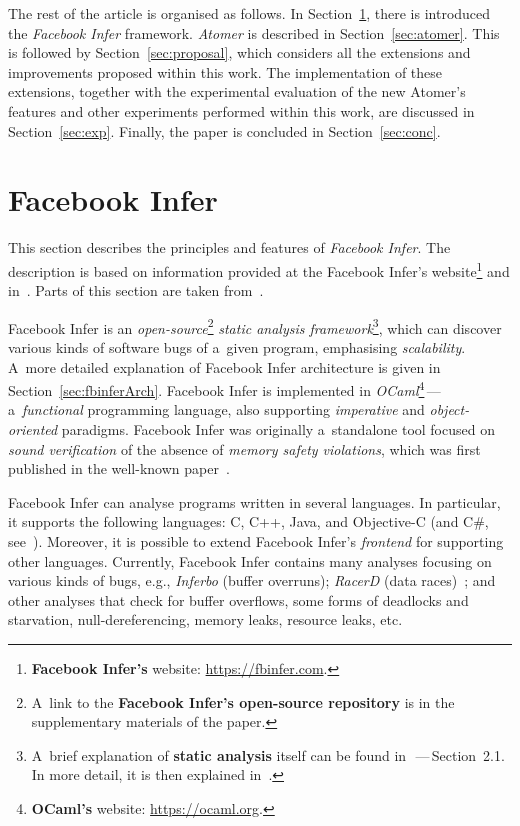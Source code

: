 \documentclass{ExcelAtFIT}
\theoremstyle{definition}
\begin{document}
The rest of the article is organised as follows. In Section~\ref{sec:infer}, there is introduced the \emph{Facebook Infer} framework. \emph{Atomer} is described in Section~\ref{sec:atomer}. This is followed by Section~\ref{sec:proposal}, which considers all the extensions and improvements proposed within this work. The implementation of these extensions, together with the experimental evaluation of the new Atomer's features and other experiments performed within this work, are discussed in Section~\ref{sec:exp}. Finally, the paper is concluded in Section~\ref{sec:conc}.


\section{Facebook Infer}
\label{sec:infer}

This section describes the principles and features of \emph{Facebook Infer}. The description is based on information provided at the Facebook Infer's website\footnote{\textbf{Facebook Infer's} website: \url{https://fbinfer.com}.} and in~\cite{inferAISpeech}. Parts of this section are taken from~\cite{harmimBP}.

Facebook Infer is an \emph{open-source}\footnote{A~link to the \textbf{Facebook Infer's open-source repository} is in the supplementary materials of the paper.} \emph{static analysis framework}\footnote{A~brief explanation of \textbf{static analysis} itself can be found in~\cite{harmimBP}\,---\,Section~2.1. In more detail, it is then explained in~\cite{staticAnalysisMoller, programAnalysisNielson, staticAnalysisRival}.}, which can discover various kinds of software bugs of a~given program, emphasising \emph{scalability}. A~more detailed explanation of Facebook Infer architecture is given in Section~\ref{sec:fbinferArch}. Facebook Infer is implemented in \emph{OCaml}\footnote{\textbf{OCaml's} website: \url{https://ocaml.org}.}\,---\,a~\emph{functional} programming language, also supporting \emph{imperative} and \emph{object-oriented} paradigms. Facebook Infer was originally a~standalone tool focused on \emph{sound verification} of the absence of \emph{memory safety violations}, which was first published in the well-known paper~\cite{inferBiabduction}.

Facebook Infer can analyse programs written in several languages. In particular, it supports the following languages: C, C++, Java, and Objective-C (and C\#, see~\cite{inferCSharp}). Moreover, it is possible to extend Facebook Infer's \emph{frontend} for supporting other languages. Currently, Facebook Infer contains many analyses focusing on various kinds of bugs, e.g., \emph{Inferbo} (buffer overruns); \emph{RacerD} (data races)~\cite{racerD, staticRaceDetectorTruePositives}; and other analyses that check for buffer overflows, some forms of deadlocks and starvation, null-dereferencing, memory leaks, resource leaks, etc.
\end{document}
